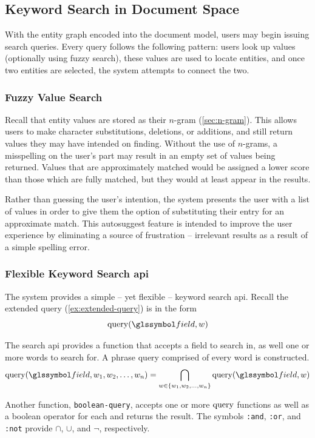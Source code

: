 	\subsection{Keyword Search in Document Space}
	\label{sec:keyword-search-document-space}
		With the entity graph encoded into the document model, users may begin issuing search queries.  Every query follows the following pattern:  users look up values (optionally using fuzzy search), these values are used to locate entities, and once two entities are selected, the system attempts to connect the two.
		
		\subsubsection{Fuzzy Value Search}
			Recall that entity values are stored as their \(n\)-gram (\cref{sec:n-gram}).  This allows users to make character substitutions, deletions, or additions, and still return values they may have intended on finding.  Without the use of \(n\)-grams, a misspelling on the user's part may result in an empty set of values being returned.  Values that are approximately matched would be assigned a lower score than those which are fully matched, but they would at least appear in the results.
			
			Rather than guessing the user's intention, the system presents the user with a list of values in order to give them the option of substituting their entry for an approximate match.  This autosuggest feature is intended to improve the user experience by eliminating a source of frustration -- irrelevant results as a result of a simple spelling error.
		
		\subsubsection{Flexible Keyword Search \gls{api}}
			The system provides a simple -- yet flexible -- keyword search \gls{api}.  Recall the extended query (\cref{ex:extended-query}) is in the form
			\[
				\query(\field, \w)
			\]
			
			The search \gls{api} provides a function that accepts a field to search in, as well one or more words to search for.  A phrase query comprised of every word is constructed.
			\[
				\query(\field, \w_1, \w_2, \dotsc, \w_n) = \bigcap_{\w \in \{\w_1, \w_2, \dotsc, \w_n\}} \query(\field, \w)
			\]
			
			Another function, \texttt{boolean-query}, accepts one or more \(\operatorname{query}\) functions as well as a boolean operator for each and returns the result.  The symbols \texttt{:and}, \texttt{:or}, and \texttt{:not} provide \(\cap\), \(\cup\), and \(\neg\), respectively.
			
